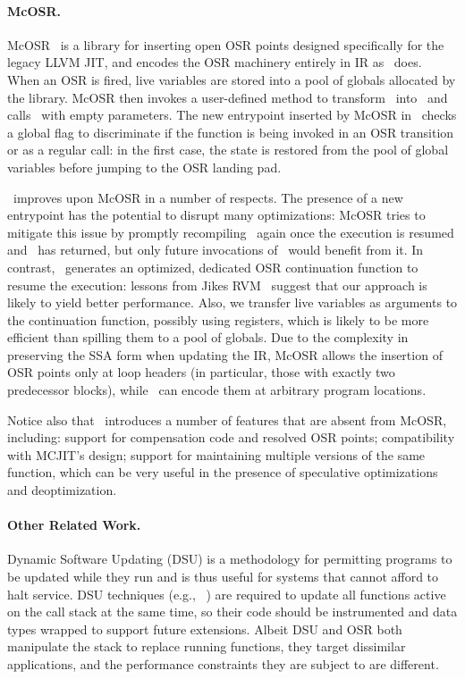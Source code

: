\paragraph*{McOSR.} McOSR~\cite{Lameed13} is a library for inserting open OSR points designed specifically for the legacy LLVM JIT, and encodes the OSR machinery entirely in IR as \osrkit\ does. When an OSR is fired, live variables are stored into a pool of globals allocated by the library. McOSR then invokes a user-defined method to transform \fbase\ into \fvariant\ and calls \fbase\ with empty parameters. The new entrypoint inserted by McOSR in \fbase\ checks a global flag to discriminate if the function is being invoked in an OSR transition or as a regular call: in the first case, the state is restored from the pool of global variables before jumping to the OSR landing pad.

\osrkit\ improves upon McOSR in a number of respects. The presence of a new entrypoint has the potential to disrupt many optimizations: McOSR tries to mitigate this issue by promptly recompiling \fbase\ again once the execution is resumed and \fbase\ has returned, but only future invocations of \fbase\ would benefit from it. In contrast, \osrkit\ generates an optimized, dedicated OSR continuation function to resume the execution: lessons from Jikes RVM~\cite{Fink03} suggest that our approach is likely to yield better performance. Also, we transfer live variables as arguments to the continuation function, possibly using registers, which is likely to be more efficient than spilling them to a pool of globals.
Due to the complexity in preserving the SSA form when updating the IR, McOSR allows the insertion of OSR points only at loop headers (in particular, those with exactly two predecessor blocks), while \osrkit\ can encode them at arbitrary program locations.

Notice also that \osrkit\ introduces a number of features that are absent from McOSR, including: support for compensation code and resolved OSR points; compatibility with MCJIT's design; support for maintaining multiple versions of the same function, which can be very useful in the presence of speculative optimizations and deoptimization.

\paragraph*{Other Related Work.}
Dynamic Software Updating (DSU) is a methodology for permitting programs to be updated while they run and is thus useful for systems that cannot afford to halt service. DSU techniques (e.g., ~\cite{Neamtiu06,Makris09}) are required to update all functions active on the call stack at the same time, so their code should be instrumented and data types wrapped to support future extensions. Albeit DSU and OSR both manipulate the stack to replace running functions, they target dissimilar applications, and the performance constraints they are subject to are different. 

